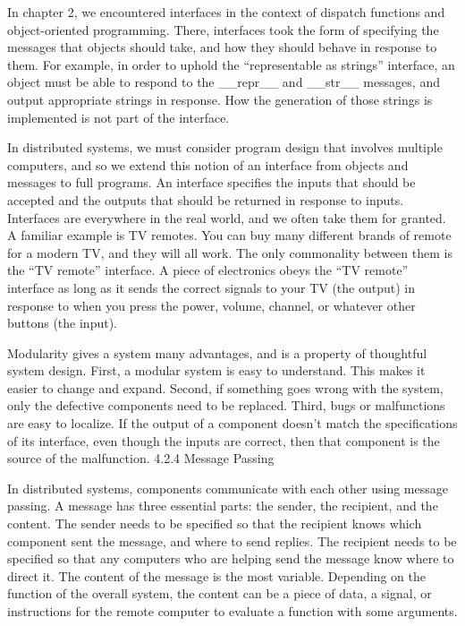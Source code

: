 \documentclass[letterpaper,10pt,dvipdfmx]{sphinxmanual}
\begin{document}
In chapter 2, we encountered interfaces in the context of dispatch functions and object-oriented programming. There, interfaces took the form of specifying the messages that objects should take, and how they should behave in response to them. For example, in order to uphold the ``representable as strings'' interface, an object must be able to respond to the \_\_repr\_\_ and \_\_str\_\_ messages, and output appropriate strings in response. How the generation of those strings is implemented is not part of the interface.

In distributed systems, we must consider program design that involves multiple computers, and so we extend this notion of an interface from objects and messages to full programs. An interface specifies the inputs that should be accepted and the outputs that should be returned in response to inputs. Interfaces are everywhere in the real world, and we often take them for granted. A familiar example is TV remotes. You can buy many different brands of remote for a modern TV, and they will all work. The only commonality between them is the ``TV remote'' interface. A piece of electronics obeys the ``TV remote'' interface as long as it sends the correct signals to your TV (the output) in response to when you press the power, volume, channel, or whatever other buttons (the input).

Modularity gives a system many advantages, and is a property of thoughtful system design. First, a modular system is easy to understand. This makes it easier to change and expand. Second, if something goes wrong with the system, only the defective components need to be replaced. Third, bugs or malfunctions are easy to localize. If the output of a component doesn't match the specifications of its interface, even though the inputs are correct, then that component is the source of the malfunction.
4.2.4   Message Passing

In distributed systems, components communicate with each other using message passing. A message has three essential parts: the sender, the recipient, and the content. The sender needs to be specified so that the recipient knows which component sent the message, and where to send replies. The recipient needs to be specified so that any computers who are helping send the message know where to direct it. The content of the message is the most variable. Depending on the function of the overall system, the content can be a piece of data, a signal, or instructions for the remote computer to evaluate a function with some arguments.
\end{document}
